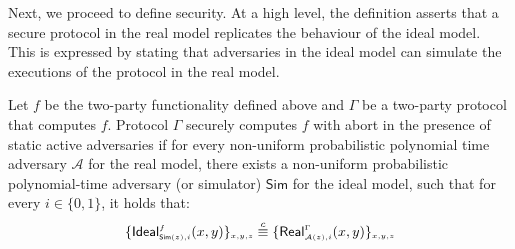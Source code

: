  
Next, we proceed to define security. At a high level, the definition asserts that a secure protocol in the real model replicates the behaviour of the ideal model. This is expressed by stating that adversaries in the ideal model can simulate the executions of the protocol in the real model. 
 
\begin{definition}\label{def::MPC-active-adv}
Let $f$ be the two-party functionality defined above and $\Gamma$ be a two-party protocol that computes $f$.   Protocol $\Gamma$ securely computes $f$ with abort in the presence of static active adversaries if for every non-uniform probabilistic polynomial time adversary $\mathcal{A}$ for the real model, there exists a non-uniform probabilistic polynomial-time adversary (or simulator) $\mathsf{Sim}$ for the ideal model, such that for every $i\in \{0,1\}$, it holds that: 
%
\begin{equation*}
\{\mathsf {Ideal}^{\scriptscriptstyle f}_{\scriptscriptstyle \mathsf{Sim}(z), i}(x,y)\}_{\scriptscriptstyle x,y,z}\stackrel{c}{\equiv} \{\mathsf{Real}_{\scriptscriptstyle \mathcal{A}(z), i}^{\scriptscriptstyle \Gamma}(x,y) \}_{\scriptscriptstyle x,y,z}
\end{equation*}
%
\end{definition}
 
 
  
  